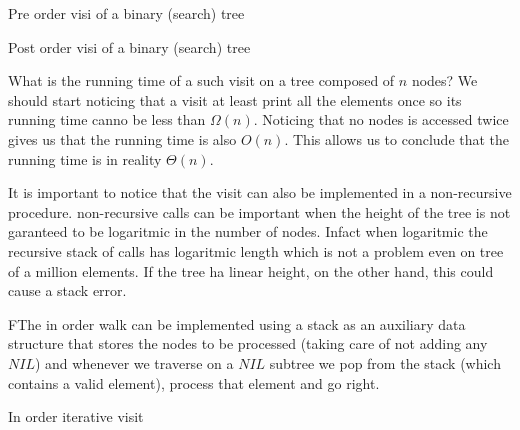 \begin{algorithm}
\caption{Pre order visi of a binary (search) tree }\label{alg:pre}
\end{algorithm}


\begin{algorithm}
\caption{Post order visi of a binary (search) tree }\label{alg:pst}
\end{algorithm}

What is the running time of a such visit on a tree composed of $n$ nodes?
We should start noticing that a visit at least print all the elements once so its running time canno be less than $\Omega(n)$.
Noticing that no nodes is accessed twice gives us that the running time is also $O(n)$. This allows us to conclude that the running time is in reality $\Theta(n)$.

It is important to notice that the visit can also be implemented in a non-recursive procedure. non-recursive calls can be important when the height of the tree is not garanteed to be logaritmic in the number of nodes. Infact when logaritmic the recursive stack of calls has logaritmic length which is not a problem even on tree of a million elements. If the tree ha linear height, on the other hand, this could cause a stack error.

FThe in order walk can be implemented using a stack as an auxiliary data structure that stores the nodes to be processed (taking care of not adding any $NIL$) and whenever we traverse on a $NIL$ subtree we pop from the stack (which contains a valid element), process that element and go right.

\begin{algorithm}
\caption{In order iterative visit }\label{alg:pst}
\end{algorithm}

